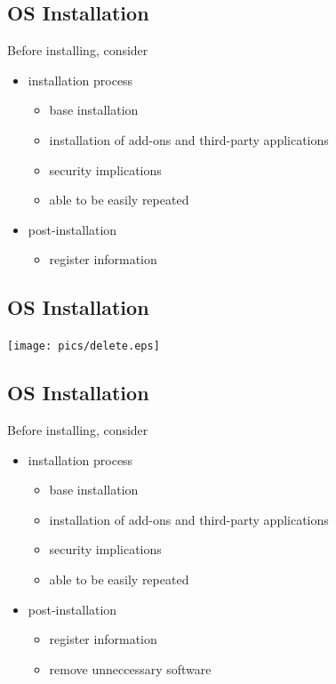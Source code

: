 \documentclass[xga]{xdvislides}
\begin{document}
\subsection{OS Installation}
Before installing, consider
\begin{itemize}
	\item installation process
		\begin{itemize}
			\item base installation
			\item installation of add-ons and third-party applications
			\item security implications
			\item able to be easily repeated
		\end{itemize}
	\item post-installation
		\begin{itemize}
			\item register information
		\end{itemize}
\end{itemize}

\subsection{OS Installation}
\vspace*{\fill}
\begin{center}
	\texttt{[image: pics/delete.eps]}
\end{center}
\vspace*{\fill}

\subsection{OS Installation}
Before installing, consider
\begin{itemize}
	\item installation process
		\begin{itemize}
			\item base installation
			\item installation of add-ons and third-party applications
			\item security implications
			\item able to be easily repeated
		\end{itemize}
	\item post-installation
		\begin{itemize}
			\item register information
			\item remove unneccessary software
		\end{itemize}
\end{itemize}
\end{document}
